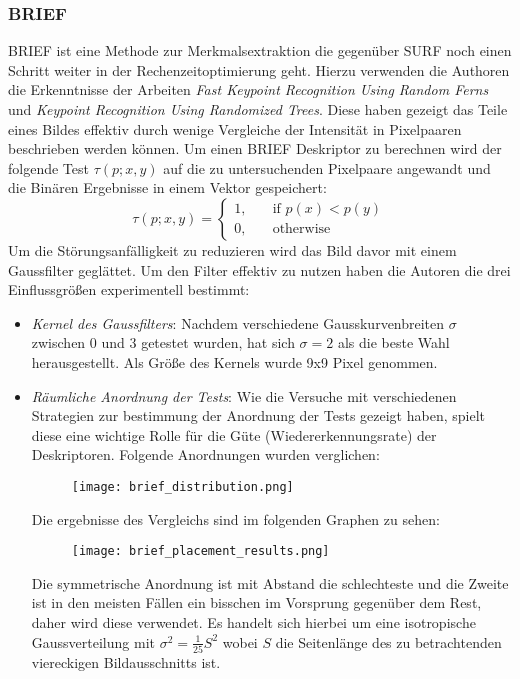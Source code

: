 \subsubsection{BRIEF}
BRIEF ist eine Methode zur Merkmalsextraktion die gegenüber SURF noch einen Schritt weiter in der Rechenzeitoptimierung geht. Hierzu verwenden die Authoren die Erkenntnisse der Arbeiten \emph{Fast Keypoint Recognition Using Random Ferns} und \emph{Keypoint Recognition Using Randomized Trees}.
Diese haben gezeigt das Teile eines Bildes effektiv durch wenige Vergleiche der Intensität in Pixelpaaren beschrieben werden können. 
Um einen BRIEF Deskriptor zu berechnen wird der folgende Test $\tau(p;x,y)$ auf die zu untersuchenden Pixelpaare angewandt und die Binären Ergebnisse in einem Vektor gespeichert:
\begin{equation}
\tau(p;x,y)=
\begin{cases}
1, & \quad \text{if } p(x) < p(y)\\
0, & \quad \text{otherwise}
\end{cases}
\end{equation}
Um die Störungsanfälligkeit zu reduzieren wird das Bild davor mit einem Gaussfilter geglättet.
Um den Filter effektiv zu nutzen haben die Autoren die drei Einflussgrößen experimentell bestimmt:
\begin{itemize}
\item \emph{Kernel des Gaussfilters}: Nachdem verschiedene Gausskurvenbreiten $\sigma$ zwischen 0 und 3 getestet wurden, hat sich $\sigma=2$ als die beste Wahl herausgestellt. Als Größe des Kernels wurde 9x9 Pixel genommen.

\item \emph{Räumliche Anordnung der Tests}: Wie die Versuche mit verschiedenen Strategien zur bestimmung der Anordnung der Tests gezeigt haben, spielt diese eine wichtige Rolle für die Güte (Wiedererkennungsrate) der Deskriptoren.
Folgende Anordnungen wurden verglichen:
\begin{figure}[h]
\texttt{[image: brief\_distribution.png]}
\centering
\end{figure}

Die ergebnisse des Vergleichs sind im folgenden Graphen zu sehen:
\begin{figure}[h]
\texttt{[image: brief\_placement\_results.png]}
\centering
\end{figure}
Die symmetrische Anordnung ist mit Abstand die schlechteste und die Zweite ist in den meisten Fällen ein bisschen im Vorsprung gegenüber dem Rest, daher wird diese verwendet.
Es handelt sich hierbei um eine isotropische Gaussverteilung mit $\sigma^2=\frac{1}{25}S^2$ wobei $S$ die Seitenlänge des zu betrachtenden viereckigen Bildausschnitts ist.

\end{itemize}

